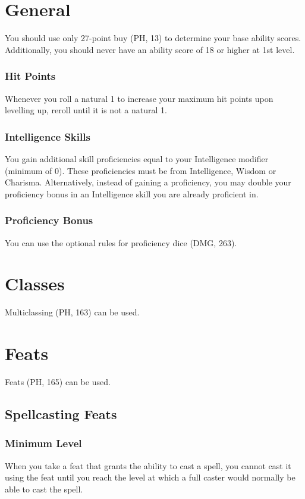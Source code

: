 \documentclass[House_Rules.tex]{subfiles}
\begin{document}
\section{General}
You should use only 27-point buy (PH, 13) to determine your base ability scores. Additionally, you should never have an ability score of 18 or higher at 1st level.

\subsubsection{Hit Points}
Whenever you roll a natural 1 to increase your maximum hit points upon levelling up, reroll until it is not a natural 1.

\subsubsection{Intelligence Skills}
You gain additional skill proficiencies equal to your Intelligence modifier (minimum of 0). These proficiencies must be from Intelligence, Wisdom or Charisma. Alternatively, instead of gaining a proficiency, you may double your proficiency bonus in an Intelligence skill you are already proficient in.

\subsubsection{Proficiency Bonus}
You can use the optional rules for proficiency dice (DMG, 263).


\section{Classes}
Multiclassing (PH, 163) can be used.




\section{Feats}
Feats (PH, 165) can be used.

\subsection{Spellcasting Feats}

\subsubsection{Minimum Level}
When you take a feat that grants the ability to cast a spell, you cannot cast it using the feat until you reach the level at which a full caster would normally be able to cast the spell.
\end{document}

